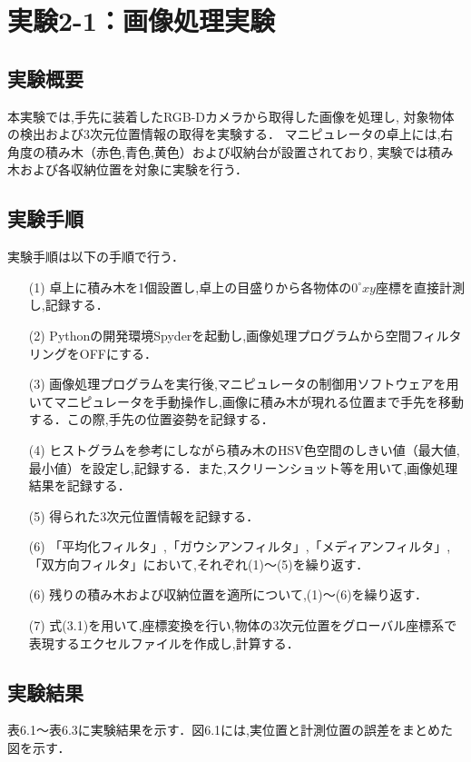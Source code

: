 
\section{実験2-1：画像処理実験}

\subsection{実験概要}
本実験では,手先に装着したRGB-Dカメラから取得した画像を処理し,
対象物体の検出および3次元位置情報の取得を実験する．
マニピュレータの卓上には,右角度の積み木（赤色,青色,黄色）および収納台が設置されており,
実験では積み木および各収納位置を対象に実験を行う．

\subsection{実験手順}
実験手順は以下の手順で行う．

\begin{enumerate}
  \item[(1)] 卓上に積み木を1個設置し,卓上の目盛りから各物体の$0^{\circ}xy$座標を直接計測し,記録する．
  \item[(2)] Pythonの開発環境Spyderを起動し,画像処理プログラムから空間フィルタリングをOFFにする．
  \item[(3)] 画像処理プログラムを実行後,マニピュレータの制御用ソフトウェアを用いてマニピュレータを手動操作し,画像に積み木が現れる位置まで手先を移動する．この際,手先の位置姿勢を記録する．
  \item[(4)] ヒストグラムを参考にしながら積み木のHSV色空間のしきい値（最大値,最小値）を設定し,記録する．また,スクリーンショット等を用いて,画像処理結果を記録する．
  \item[(5)] 得られた3次元位置情報を記録する．
  \item[(6)] 「平均化フィルタ」,「ガウシアンフィルタ」,「メディアンフィルタ」,「双方向フィルタ」において,それぞれ(1)～(5)を繰り返す．
  \item[(6)] 残りの積み木および収納位置を適所について,(1)～(6)を繰り返す．
  \item[(7)] 式(3.1)を用いて,座標変換を行い,物体の3次元位置をグローバル座標系で表現するエクセルファイルを作成し,計算する．
\end{enumerate}

\subsection{実験結果}
表6.1～表6.3に実験結果を示す．図6.1には,実位置と計測位置の誤差をまとめた図を示す．

